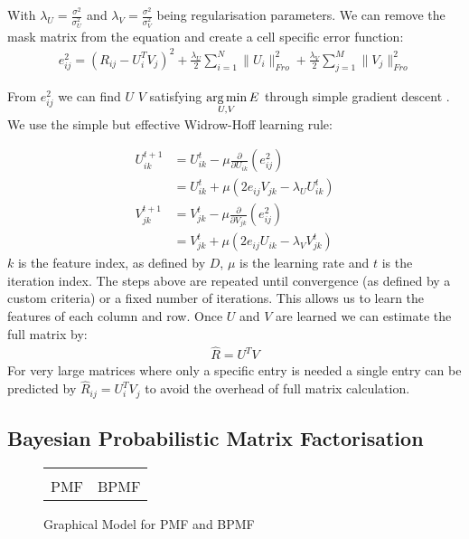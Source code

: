 With $\lambda_U = \frac{\sigma^2}{\sigma_U^2}$ and $\lambda_V = \frac{\sigma^2}{\sigma_V^2}$ being regularisation parameters. We can remove the mask matrix from the equation and create a cell specific error function:
\begin{align*}
e_{ij}^2= (R_{ij}-U_i^TV_j)^2 + \frac{\lambda_U}{2}\sum_{i=1}^{N} \|U_i\|_{Fro}^2 
+ \frac{\lambda_V}{2} \sum_{j=1}^{M} \|V_j\|_{Fro}^2
\end{align*}

From $e_{ij}^2$ we can find $U$ $V$ satisfying $\underset{U,V}{\operatorname*{arg\,min}} \, E$ through simple gradient descent \cite{nnmf-grad}. We use the simple but effective Widrow-Hoff learning rule:

\begin{align*}
U_{ik}^{t+1} &= U_{ik}^{t} - \mu \frac{\partial}{\partial U_{ik}}(e_{ij}^2) \\
&= U_{ik}^{t} + \mu (2 e_{ij}V_{jk} - \lambda_U  U_{ik}^{t})\\
V_{jk}^{t+1} &= V_{jk}^{t} - \mu \frac{\partial}{\partial V_{jk}}(e_{ij}^2) \\
&= V_{jk}^{t} + \mu (2 e_{ij}U_{ik} - \lambda_V  V_{jk}^{t})
\end{align*}
$k$ is the feature index, as defined by $D$, $\mu$ i{\tiny }s the learning rate and $t$ is the iteration index. The steps above are repeated until convergence (as defined by a custom criteria) or a fixed number of iterations. This allows us to learn the features of each column and row. Once $U$ and $V$ are learned we can estimate the full matrix by:
\begin{align}
\hat{R} = U^T V
\end{align}
For very large matrices where only a specific entry is needed a single entry can be predicted by $\hat{R}_{ij} = U_i^T V_j$ to avoid the overhead of full matrix calculation.
\subsection{Bayesian Probabilistic Matrix Factorisation}
\label{sec:bpmf}
\begin{figure}[!ht]
  \begin{center}
    \begin{tabular}{cc}
       &
       \\
      PMF & BPMF
    \end{tabular}
  \end{center}
  \caption{Graphical Model for PMF and BPMF}
  \label{fig:bpmf_pmf_gm}
\end{figure}


